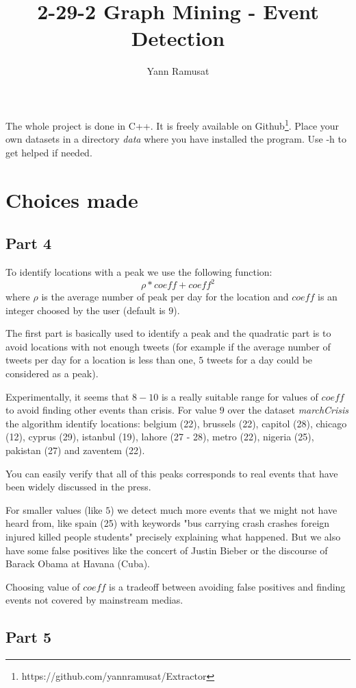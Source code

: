 \documentclass[a4paper]{article}
\title{2-29-2 Graph Mining - Event Detection}
\author{Yann Ramusat}
\begin{document}
\maketitle
The whole project is done in C++. It is freely available on Github\footnote{https://github.com/yannramusat/Extractor}. Place your own datasets in a directory \textit{data} where you have installed the program. Use -h to get helped if needed. 

\section{Choices made}
\subsection{Part 4}
 To identify locations with a peak we use the following function:
\[
   \rho*coeff + coeff^2
\]
 where $\rho$ is the average number of peak per day for the location and $coeff$ is an integer choosed by the user (default is $9$). 
 
 The first part is basically used to identify a peak and the quadratic part is to avoid locations with not enough tweets (for example if the average number of tweets per day for a location is less than one, $5$ tweets for a day could be considered as a peak).
 
 Experimentally, it seems that $8-10$ is a really suitable range for values of $coeff$ to avoid finding other events than crisis. For value $9$ over the dataset \textit{marchCrisis} the algorithm identify locations: belgium (22), brussels (22), capitol (28), chicago (12), cyprus (29), istanbul (19), lahore (27 - 28), metro (22), nigeria (25), pakistan (27) and zaventem (22).
 
 You can easily verify that all of this peaks corresponds to real events that have been widely discussed in the press.
 
 For smaller values (like $5$) we detect much more events that we might not have heard from, like spain (25) with keywords "bus carrying crash crashes foreign injured killed people students" precisely explaining what happened. But we also have some false positives like the concert of Justin Bieber or the discourse of Barack Obama at Havana (Cuba).
 
 Choosing value of $coeff$ is a tradeoff between avoiding false positives and finding events not covered by mainstream medias.
 
\subsection{Part 5}
\end{document}
